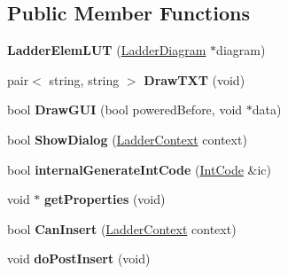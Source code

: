 \subsection*{Public Member Functions}
\begin{DoxyCompactItemize}
\item 
\hypertarget{class_ladder_elem_l_u_t_a69566c6dfa6a190545bbe69262cfd16f}{{\bfseries Ladder\-Elem\-L\-U\-T} (\hyperlink{class_ladder_diagram}{Ladder\-Diagram} $\ast$diagram)}\label{class_ladder_elem_l_u_t_a69566c6dfa6a190545bbe69262cfd16f}

\item 
\hypertarget{class_ladder_elem_l_u_t_adf99aeac97bc0ea67537ff34bac6b676}{pair$<$ string, string $>$ {\bfseries Draw\-T\-X\-T} (void)}\label{class_ladder_elem_l_u_t_adf99aeac97bc0ea67537ff34bac6b676}

\item 
\hypertarget{class_ladder_elem_l_u_t_a62604b9a453829399a33190c28aa28ec}{bool {\bfseries Draw\-G\-U\-I} (bool powered\-Before, void $\ast$data)}\label{class_ladder_elem_l_u_t_a62604b9a453829399a33190c28aa28ec}

\item 
\hypertarget{class_ladder_elem_l_u_t_ae989efcd4e1b1e720fed9fc2136843e1}{bool {\bfseries Show\-Dialog} (\hyperlink{struct_ladder_context}{Ladder\-Context} context)}\label{class_ladder_elem_l_u_t_ae989efcd4e1b1e720fed9fc2136843e1}

\item 
\hypertarget{class_ladder_elem_l_u_t_a1b0fea971029e6c8f46a2e459a8ed75f}{bool {\bfseries internal\-Generate\-Int\-Code} (\hyperlink{class_int_code}{Int\-Code} \&ic)}\label{class_ladder_elem_l_u_t_a1b0fea971029e6c8f46a2e459a8ed75f}

\item 
\hypertarget{class_ladder_elem_l_u_t_a81d220ea3d402f3e64a1b235c21a9f32}{void $\ast$ {\bfseries get\-Properties} (void)}\label{class_ladder_elem_l_u_t_a81d220ea3d402f3e64a1b235c21a9f32}

\item 
\hypertarget{class_ladder_elem_l_u_t_a145d30b441795c0d6a29a71c800764a9}{bool {\bfseries Can\-Insert} (\hyperlink{struct_ladder_context}{Ladder\-Context} context)}\label{class_ladder_elem_l_u_t_a145d30b441795c0d6a29a71c800764a9}

\item 
\hypertarget{class_ladder_elem_l_u_t_ae6973942ae6a47c34a445190a5e4fc6d}{void {\bfseries do\-Post\-Insert} (void)}\label{class_ladder_elem_l_u_t_ae6973942ae6a47c34a445190a5e4fc6d}


\end{DoxyCompactItemize}
